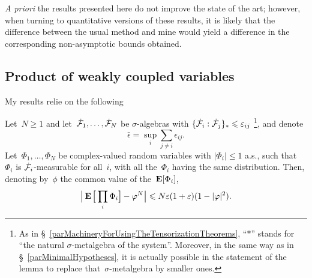 \emph{A priori} the results presented here do not improve the state of the art;
however, when turning to quantitative versions of these results,
it is likely that the difference between the usual method and mine
would yield a difference in the corresponding non-asymptotic bounds obtained.


\subsection{Product of weakly coupled variables}

My results relie on the following
%
\begin{Lem}\label{l1840}
Let~$N \geq 1$ and let~$\dot{\mcal{F}}_1, \ldots, \dot{\mcal{F}}_N$ be $\sigma$-algebras with
$\{ \dot{\mcal{F}}_i : \dot{\mcal{F}}_j \}_* \leq \epsilon_{ij}$%
\footnote{As in \S~\ref{parMachineryForUsingTheTensorizationTheorems},
``$*$'' stands for ``the natural $\sigma$-metalgebra of the system''.
Moreover, in the same way as in \S~\ref{parMinimalHypotheses},
it is actually possible in the statement of the lemma
to replace that~$\sigma$-metalgebra by smaller ones.},
and denote
\[ \bar\epsilon = \sup_i \sum_{j\neq i} \epsilon_{ij} .\]
Let~$\Phi_1, \ldots, \Phi_N$ be complex-valued random variables with $|\Phi_i|\leq1$ a.s.,
such that $\Phi_i$ is $\dot{\mcal{F}}_i$-measurable for all~$i$,
with all the~$\Phi_i$ having the same distribution.
Then, denoting by~$\phi$ the common value of the~$\mathop{\smash{\mathbf{E}}}\nolimits[\Phi_i]$,
\[\label{fo9356} \Big| \EE\Big[ \prod_{i} \Phi_i \Big] - \phi^N \Big| \leq
N \bar\epsilon(1+\bar\epsilon) (1-|\phi|^2) .\]
\end{Lem}


